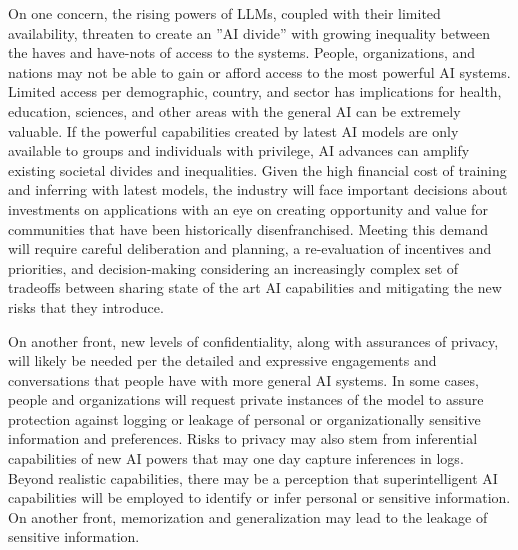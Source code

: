 On one concern, the rising powers of LLMs, coupled with their limited availability, threaten to create an ''AI divide'' with growing inequality between the haves and have-nots of access to the systems. People, organizations, and nations may not be able to gain or afford access to the most powerful AI systems. Limited access per demographic, country, and sector has implications for health, education, sciences, and other areas with the general AI can be extremely valuable. If the powerful capabilities created by latest AI models are only available to groups and individuals with privilege, AI advances can amplify existing societal divides and inequalities. Given the high financial cost of training and inferring with latest models, the industry will face important decisions about investments on applications with an eye on creating opportunity and value for communities that have been historically disenfranchised. Meeting this demand will require careful deliberation and planning, a re-evaluation of incentives and priorities, and decision-making considering an increasingly complex set of tradeoffs between sharing state of the art AI capabilities and mitigating the new risks that they introduce.

On another front, new levels of confidentiality, along with assurances of privacy, will likely be needed per the detailed and expressive engagements and conversations that people have with more general AI systems. In some cases, people and organizations will request private instances of the model to assure protection against logging or leakage of personal or organizationally sensitive information and preferences. Risks to privacy may also stem from inferential capabilities of new AI powers that may one day capture inferences in logs. Beyond realistic capabilities, there may be a perception that superintelligent AI capabilities will be employed to identify or infer personal or sensitive information. On another front, memorization and generalization may lead to the leakage of sensitive information. 

